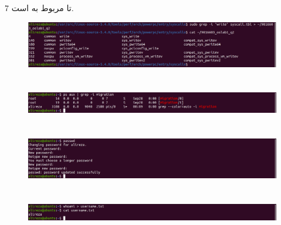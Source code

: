 \documentclass{article}
\begin{document}
\subsection{}
7 تا مربوط به
است.
\begin{figure}[ht]
    \centering
    \includegraphics[width=1.0\textwidth]{figures/b.png}
    \caption{}
    \label{fig:fig1}
\end{figure}
\FloatBarrier

\section{}
\begin{figure}[ht]
    \centering
    \includegraphics[width=1.0\textwidth]{figures/5.png}
    \caption{}
    \label{fig:fig1}
\end{figure}
\FloatBarrier

\section{}
\begin{figure}[ht]
    \centering
    \includegraphics[width=1.0\textwidth]{figures/6.png}
    \caption{}
    \label{fig:fig1}
\end{figure}
\FloatBarrier

\section{}
\begin{figure}[ht]
    \centering
    \includegraphics[width=1.0\textwidth]{figures/7.png}
    \caption{}
    \label{fig:fig1}
\end{figure}
\FloatBarrier
\end{document}
